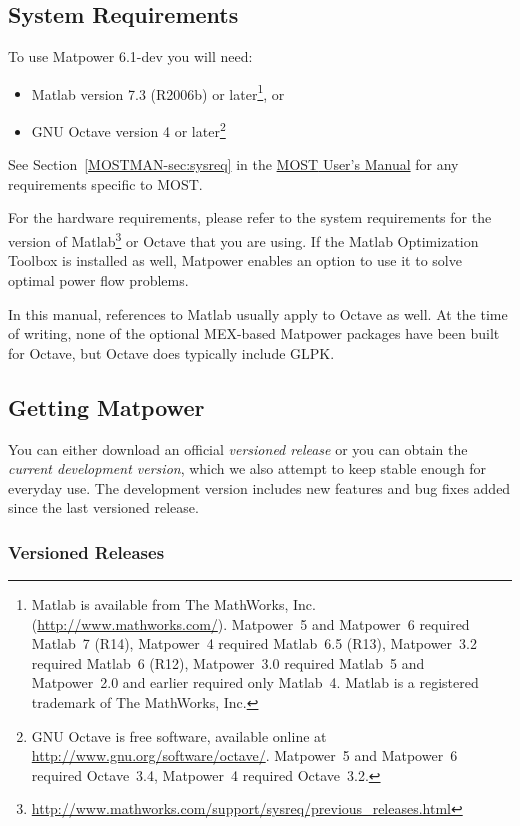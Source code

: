 \documentclass[12pt]{article}
\newcommand{\mpver}[0]{6.1-dev}
\newcommand{\matlab}[0]{{\sc Matlab}}
\newcommand{\matpower}[0]{{\sc Matpower}}
\newcommand{\most}[0]{{MOST}}
\newcommand{\mostver}[0]{1.0}
\newcommand{\glpk}[0]{{GLPK}}
\newcommand{\ot}[0]{{Optimization Toolbox}}
\newcommand{\mostmanurl}[0]{http://www.pserc.cornell.edu/matpower/docs/MOST-manual-\mostver.pdf}
\newcommand{\mostman}[0]{\href{\mostmanurl}{\most{} User's Manual}}
\numberwithin{equation}{section}
\numberwithin{table}{section}
\numberwithin{figure}{section}
\begin{document}
\subsection{System Requirements}
\label{sec:sysreq}
To use \matpower{} \mpver{} you will need:
\begin{itemize}
\item \matlab{}\textsuperscript{\tiny \textregistered} version 7.3 (R2006b) or later\footnote{\matlab{} is available from The MathWorks, Inc. (\url{http://www.mathworks.com/}). \matpower{}~5 and \matpower{}~6 required \matlab{}~7 (R14), \matpower{}~4 required \matlab{}~6.5 (R13), \matpower{}~3.2 required \matlab{}~6 (R12), \matpower{}~3.0 required \matlab{}~5 and \matpower{}~2.0 and earlier required only \matlab{}~4. \matlab{} is a registered trademark of The MathWorks, Inc.}, or
\item GNU Octave version 4 or later\footnote{GNU Octave \cite{octave} is free software, available online at \url{http://www.gnu.org/software/octave/}. \matpower{}~5 and \matpower{}~6 required Octave~3.4, \matpower{}~4 required Octave~3.2.}
\end{itemize}

See Section~\ref{MOSTMAN-sec:sysreq} in the \mostman{} for any requirements specific to \most{}.

For the hardware requirements, please refer to the system requirements for the version of \matlab{}\footnote{\url{http://www.mathworks.com/support/sysreq/previous_releases.html}} or Octave that you are using. If the \matlab{} \ot{} is installed as well, \matpower{} enables an option to use it to solve optimal power flow problems.

In this manual, references to \matlab{} usually apply to Octave as well. At the time of writing, none of the optional MEX-based \matpower{} packages have been built for Octave, but Octave does typically include \glpk{}.

\clearpage
\subsection{Getting \matpower{}}
\label{sec:gettingmatpower}

You can either download an official \emph{versioned release} or you can obtain the \emph{current development version}, which we also attempt to keep stable enough for everyday use. The development version includes new features and bug fixes added since the last versioned release.

\subsubsection{Versioned Releases}
\end{document}
